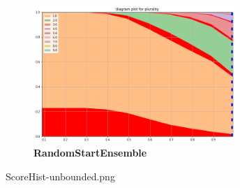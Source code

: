 \documentclass{article}
\begin{document}
\begin{figure}[h]
\begin{center}
\includegraphics[width=3in]{figures/RandomStartEnsemble.png}
\end{center}
\caption{{\bf RandomStartEnsemble}
\label{fig:RandomStartEnsemble}}
\end{figure}

ScoreHist-unbounded.png





\appendix

\end{document}
